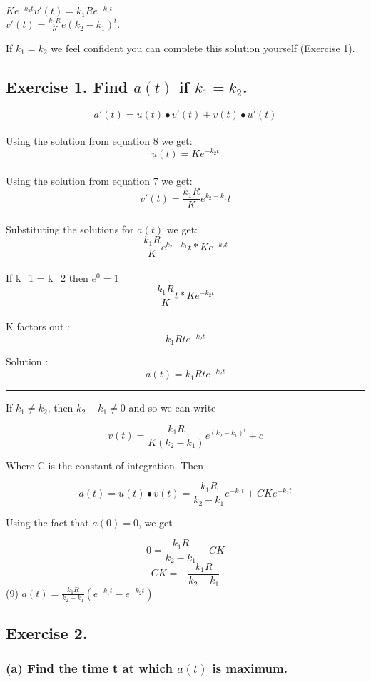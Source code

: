 \documentclass[]{article}
\begin{document}
\(Ke^{-k_2t}v'(t) = k_1Re^{-k_1t}\)\\
\(v'(t) = \frac{k_1R}{K}e(k_2-k_1)^t\).

If \(k_1 = k_2\) we feel confident you can complete this solution
yourself (Exercise 1).

\subsection{\texorpdfstring{Exercise 1. Find \(a(t)\) if
\(k_1 = k_2\).}{Exercise 1. Find a(t) if k\_1 = k\_2.}}\label{exercise-1.-find-at-if-k_1-k_2.}

\[a'(t) = u(t) \bullet v'(t) + v(t) \bullet u'(t)\]\\
Using the solution from equation 8 we get: \[u(t) = Ke^{-k_2t}\]\\
Using the solution from equation 7 we get:
\[v'(t) = \frac{k_1R}{K}e^{k_2 - k_1}t\]\\
Substituting the solutions for \(a(t)\) we get:
\[\frac{k_1R}{K}e^{k_2 - k_1}t * Ke^{-k_2t}\]\\
If k\_1 = k\_2 then \(e^{0} = 1\)\\
\[\frac{k_1R}{K}t * Ke^{-k_2t}\]\\
K factors out : \[k_1Rte^{-k_2t}\]

Solution : \[a(t) = k_1Rte^{-k_2t}\]

\begin{center}\rule{0.5\linewidth}{\linethickness}\end{center}

If \(k_1 \neq k_2\), then \(k_2 - k _1 \neq 0\) and so we can write

\[v(t) = \frac{k_1R}{K(k_2 - k_1)}e^(k_2 -k_1)^t +c\]

Where C is the constant of integration. Then

\[a(t) = u(t) \bullet v(t) = \frac{k_1R}{k_2-k_1}e^{-k_1t} + CKe^{-k_2t}\]

Using the fact that \(a(0) = 0\), we get

\[0 = \frac{k_1R}{k_2-k_1} + CK\] \[CK = -\frac{k_1R}{k_2-k_1}\] (9)
\(a(t) = \frac{k_1R}{k_2-k_1}(e^{-k_1t} - e^{-k_2t})\)

\subsection{Exercise 2.}\label{exercise-2.}

\subsubsection{\texorpdfstring{(a) Find the time t at which \(a(t)\) is
maximum.}{(a) Find the time t at which a(t) is maximum.}}\label{a-find-the-time-t-at-which-at-is-maximum.}
\end{document}

